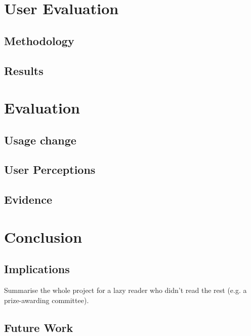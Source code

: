 \documentclass{l4proj}
\begin{document}
\chapter{User Evaluation}

\section{Methodology}

\section{Results}

\chapter{Evaluation} 

\section{Usage change}

\section{User Perceptions}

\section{Evidence}

\chapter{Conclusion}  
\section{Implications}
Summarise the whole project for a lazy reader who didn't read the rest (e.g. a prize-awarding committee).
\section{Future Work}


\end{document}
